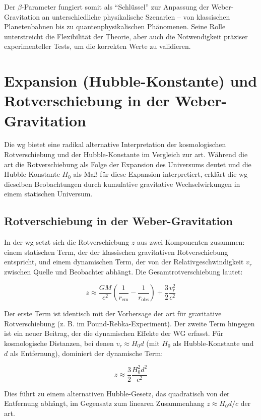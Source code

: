 Der $\beta$-Parameter fungiert somit als \enquote{Schlüssel} zur Anpassung der Weber-Gravitation an unterschiedliche physikalische Szenarien – von klassischen Planetenbahnen
bis zu quantenphysikalischen Phänomenen. Seine Rolle unterstreicht die Flexibilität der Theorie, aber auch die Notwendigkeit präziser experimenteller Tests, um die korrekten
Werte zu validieren.

\section{Expansion (Hubble-Konstante) und Rotverschiebung in der Weber-Gravitation}
Die \gls{wg} bietet eine radikal alternative Interpretation der kosmologischen Rotverschiebung und der Hubble-Konstante im Vergleich zur \gls{art}. Während die
\gls{art} die Rotverschiebung als Folge der Expansion des Universums deutet und die Hubble-Konstante $H_0$ als Maß für diese Expansion interpretiert, erklärt die \gls{wg}
dieselben Beobachtungen durch kumulative gravitative Wechselwirkungen in einem statischen Universum.

\subsection{Rotverschiebung in der Weber-Gravitation}
In der \gls{wg} setzt sich die Rotverschiebung $z$ aus zwei Komponenten zusammen: einem statischen Term, der der klassischen gravitativen Rotverschiebung entspricht, und einem
dynamischen Term, der von der Relativgeschwindigkeit $v_r$ zwischen Quelle und Beobachter abhängt. Die Gesamtrotverschiebung lautet:

\begin{equation}
    z \approx \frac{GM}{c^2} \left( \frac{1}{r_{\text{em}}} - \frac{1}{r_{\text{obs}}} \right) + \frac{3}{2} \frac{v_r^2}{c^2}
\end{equation}

Der erste Term ist identisch mit der Vorhersage der \gls{art} für gravitative Rotverschiebung (z. B. im Pound-Rebka-Experiment). Der zweite Term hingegen ist ein neuer Beitrag,
der die dynamischen Effekte der WG erfasst. Für kosmologische Distanzen, bei denen $v_r \approx H_0 d$ (mit $H_0$ als Hubble-Konstante und $d$ als Entfernung), dominiert
der dynamische Term:

\begin{equation}
    z \approx \frac{3}{2} \frac{H_0^2 d^2}{c^2}
\end{equation}

Dies führt zu einem alternativen Hubble-Gesetz, das quadratisch von der Entfernung abhängt, im Gegensatz zum linearen Zusammenhang $z \approx H_0 d / c$ der \gls{art}.

